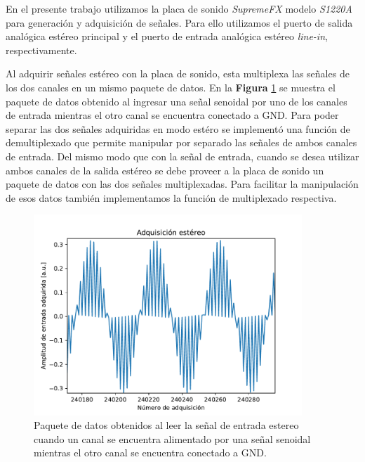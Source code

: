 \documentclass[a4paper,11pt]{article}
\begin{document}
En el presente trabajo utilizamos la placa de sonido \emph{SupremeFX} modelo \emph{S1220A} para generación y adquisición de señales.  Para ello
utilizamos el puerto de salida analógica estéreo principal y el puerto
de entrada analógica estéreo \emph{line-in}, respectivamente.

Al adquirir señales estéreo con la placa de sonido, esta multiplexa las
señales de los dos canales en un mismo paquete de datos. En la
\textbf{Figura} \ref{fig:multiplexado} se muestra el paquete de datos
obtenido al ingresar una señal senoidal por uno de los canales de
entrada mientras el otro canal se encuentra conectado a
GND.
Para poder separar las dos señales adquiridas en modo estéro se
implementó una función de demultiplexado que permite manipular por
separado las señales de ambos canales de entrada.  Del mismo modo que
con la señal de entrada, cuando se desea utilizar ambos canales de la
salida estéreo se debe proveer a la placa de sonido un paquete de datos
con las dos señales multiplexadas. Para facilitar la manipulación de esos
datos también implementamos la función de multiplexado respectiva.

    \begin{figure}[!h] 
        \centering
        \includegraphics[width=0.9\textwidth]{imagenes/estereo.pdf}
        \caption{Paquete de datos obtenidos al leer la señal de entrada
estereo cuando un canal se encuentra alimentado por una señal senoidal
mientras el otro canal se encuentra conectado a GND.}
        \label{fig:multiplexado} 
    \end{figure}
\end{document}
